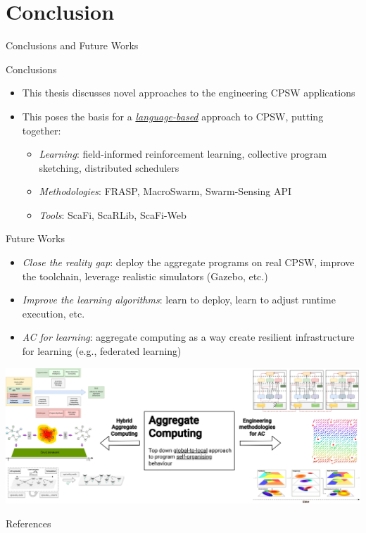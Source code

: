 \documentclass[presentation, 8pt,169]{beamer}\mode<presentation>{\usetheme{AMSBolognaFC}}
\begin{document}
\section{Conclusion}
\begin{frame}{Conclusions and Future Works}
\begin{alertblock}{Conclusions}
  \begin{itemize}
    \item This thesis discusses novel approaches to the engineering CPSW applications
    \item This poses the basis for a \emph{\underline{language-based}} approach to CPSW, putting together:
    \begin{itemize}
      \item \emph{{Learning}}: field-informed reinforcement learning, collective program sketching, distributed schedulers
      \item \emph{{Methodologies}}: FRASP, MacroSwarm, Swarm-Sensing API
      \item \emph{{Tools}}: ScaFi, ScaRLib, ScaFi-Web
    \end{itemize}
  \end{itemize}
\end{alertblock}
\begin{block}{Future Works}
  \begin{itemize}
    \item \emph{Close the reality gap}: deploy the aggregate programs on real CPSW, improve the toolchain, leverage realistic simulators (Gazebo, etc.)
    \item \emph{Improve the learning algorithms}: learn to deploy, learn to adjust runtime execution, etc.
    \item \emph{AC for learning}: aggregate computing as a way create resilient infrastructure for learning (e.g., federated learning)
  \end{itemize}
\end{block}
\end{frame}

\begin{frame}
\includegraphics[width=\textwidth]{img/contribution.drawio.png}
\end{frame}
\begin{frame}[allowframebreaks]{References}
  \def\bibfont{\footnotesize}
  \printbibliography
\end{frame}

\end{document}
